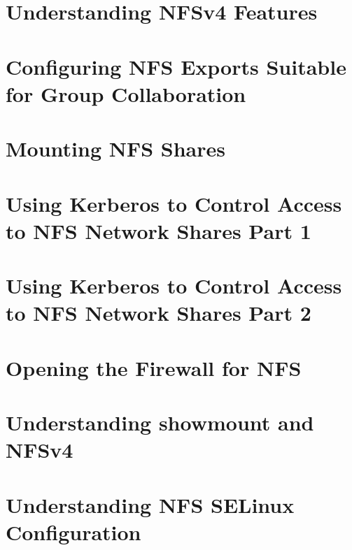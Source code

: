 
\usepackage{minted}
\usepackage{booktabs}


	
	
	\section{Understanding NFSv4 Features}
	\section{Configuring NFS Exports Suitable for Group Collaboration}
	\section{Mounting NFS Shares}
	\section{Using Kerberos to Control Access to NFS Network Shares Part 1}
	\section{Using Kerberos to Control Access to NFS Network Shares Part 2}
	\section{Opening the Firewall for NFS}
	\section{Understanding showmount and NFSv4}
	\section{Understanding NFS SELinux Configuration}


